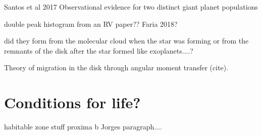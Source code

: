 \citep{santos_observational_2017} Santos et al 2017   Observational evidence for two distinct giant planet populations
 

double peak histogram from an {RV} paper?? Faria 2018?


did they form from the molecular cloud when the star was forming or from the remnants of the disk after the star formed like exoplanets....?


Theory of migration in the disk through  angular moment transfer (cite).


\section{Conditions for life?}
habitable zone stuff
proxima b
Jorges paragraph....
